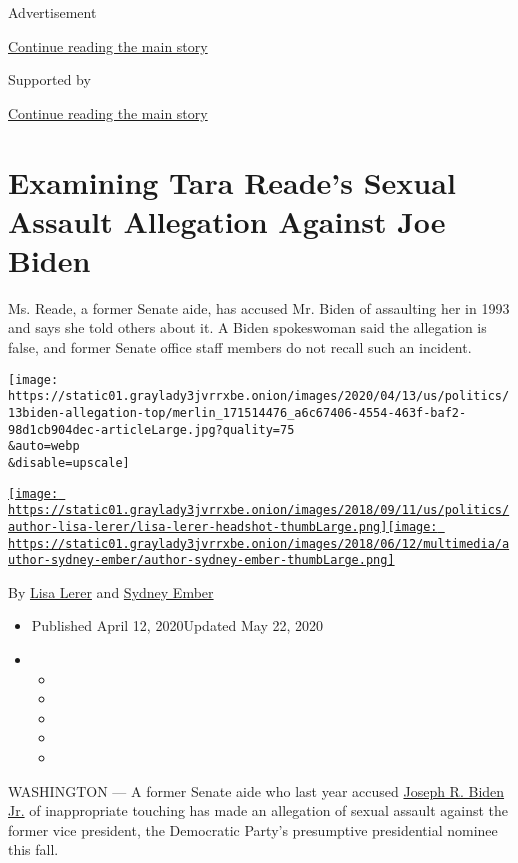 Advertisement

\protect\hyperlink{after-top}{Continue reading the main story}

Supported by

\protect\hyperlink{after-sponsor}{Continue reading the main story}

\hypertarget{examining-tara-reades-sexual-assault-allegation-against-joe-biden}{%
\section{Examining Tara Reade's Sexual Assault Allegation Against Joe
Biden}\label{examining-tara-reades-sexual-assault-allegation-against-joe-biden}}

Ms. Reade, a former Senate aide, has accused Mr. Biden of assaulting her
in 1993 and says she told others about it. A Biden spokeswoman said the
allegation is false, and former Senate office staff members do not
recall such an incident.

\texttt{[image: https://static01.graylady3jvrrxbe.onion/images/2020/04/13/us/politics/13biden-allegation-top/merlin\_171514476\_a6c67406-4554-463f-baf2-98d1cb904dec-articleLarge.jpg?quality=75\\\&auto=webp\\\&disable=upscale]}

\href{https://www.nytimes3xbfgragh.onion/by/lisa-lerer}{\texttt{[image: https://static01.graylady3jvrrxbe.onion/images/2018/09/11/us/politics/author-lisa-lerer/lisa-lerer-headshot-thumbLarge.png]}}\href{https://www.nytimes3xbfgragh.onion/by/sydney-ember}{\texttt{[image: https://static01.graylady3jvrrxbe.onion/images/2018/06/12/multimedia/author-sydney-ember/author-sydney-ember-thumbLarge.png]}}

By \href{https://www.nytimes3xbfgragh.onion/by/lisa-lerer}{Lisa Lerer}
and \href{https://www.nytimes3xbfgragh.onion/by/sydney-ember}{Sydney
Ember}

\begin{itemize}
\item
  Published April 12, 2020Updated May 22, 2020
\item
  \begin{itemize}
  \item
  \item
  \item
  \item
  \item
  \end{itemize}
\end{itemize}

WASHINGTON --- A former Senate aide who last year accused
\href{https://www.nytimes3xbfgragh.onion/2020/05/07/us/politics/tara-reade-megyn-kelly-interview.html}{Joseph
R. Biden Jr.} of inappropriate touching has made an allegation of sexual
assault against the former vice president, the Democratic Party's
presumptive presidential nominee this fall.

